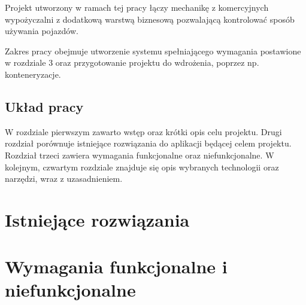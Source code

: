 \documentclass[eng,printmode,openany]{mgr}
\begin{document}
	Projekt utworzony w ramach tej pracy łączy mechanikę z komercyjnych wypożyczalni z dodatkową warstwą biznesową pozwalającą kontrolować sposób używania pojazdów.
	
	Zakres pracy obejmuje utworzenie systemu spełniającego wymagania postawione w rozdziale 3 oraz przygotowanie projektu do wdrożenia, poprzez np. konteneryzacje.
	
	\section{Układ pracy}
	W rozdziale pierwszym zawarto wstęp oraz krótki opis celu projektu. Drugi rozdział porównuje istniejące rozwiązania do aplikacji będącej celem projektu. Rozdział trzeci zawiera wymagania funkcjonalne oraz niefunkcjonalne. W kolejnym, czwartym rozdziale znajduje się opis wybranych technologii oraz narzędzi, wraz z uzasadnieniem. 
	
	\newpage
	\chapter{Istniejące rozwiązania}
	
	\newpage
	\chapter{Wymagania funkcjonalne i niefunkcjonalne}
\end{document}
